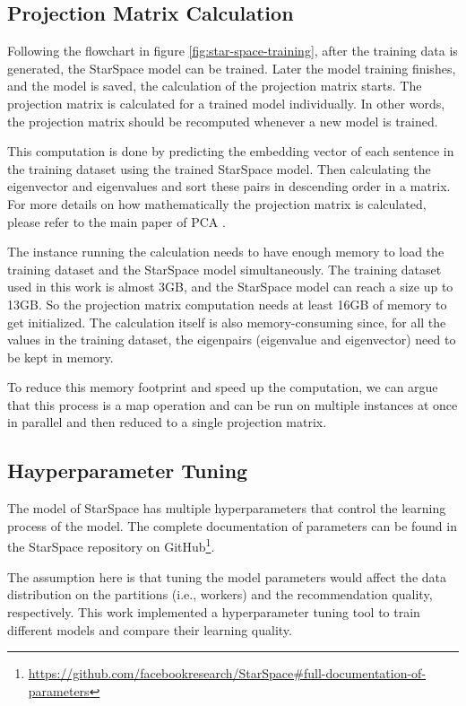 \subsection{Projection Matrix Calculation}
\label{subsec:projection-matrix-calculation}
Following the flowchart in figure \ref{fig:star-space-training}, after the training data is generated, the StarSpace model can be trained. Later the model training finishes, and the model is saved, the calculation of the projection matrix starts. The projection matrix is calculated for a trained model individually. In other words, the projection matrix should be recomputed whenever a new model is trained.


This computation is done by predicting the embedding vector of each sentence in the training dataset using the trained StarSpace model. Then calculating the eigenvector and eigenvalues and sort these pairs in descending order in a matrix. For more details on how mathematically the projection matrix is calculated, please refer to the main paper of PCA \cite{woldPrincipalComponentAnalysis}.


The instance running the calculation needs to have enough memory to load the training dataset and the StarSpace model simultaneously. The training dataset used in this work is almost 3GB, and the StarSpace model can reach a size up to 13GB. So the projection matrix computation needs at least 16GB of memory to get initialized. The calculation itself is also memory-consuming since, for all the values in the training dataset, the eigenpairs (eigenvalue and eigenvector) need to be kept in memory.



To reduce this memory footprint and speed up the computation, we can argue that this process is a map operation and can be run on multiple instances at once in parallel and then reduced to a single projection matrix.


\subsection{Hayperparameter Tuning}
\label{subsec:hyperparameter-tuning}
The model of StarSpace has multiple hyperparameters that control the learning process of the model. The complete documentation of parameters can be found in the StarSpace repository on GitHub\footnote{\url{https://github.com/facebookresearch/StarSpace\#full-documentation-of-parameters}}. 


The assumption here is that tuning the model parameters would affect the data distribution on the partitions (i.e., workers) and the recommendation quality, respectively. This work implemented a hyperparameter tuning tool to train different models and compare their learning quality.


